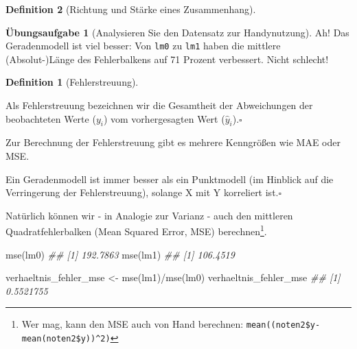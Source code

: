 \documentclass[
  a4paper,
  DIV=11]{scrreprt}
\newenvironment{Shaded}{\begin{snugshade}}{\end{snugshade}}
\newcommand{\DocumentationTok}[1]{\textcolor[rgb]{0.37,0.37,0.37}{\textit{#1}}}
\newcommand{\FunctionTok}[1]{\textcolor[rgb]{0.28,0.35,0.67}{#1}}
\newcommand{\NormalTok}[1]{\textcolor[rgb]{0.00,0.23,0.31}{#1}}
\newcommand{\OtherTok}[1]{\textcolor[rgb]{0.00,0.23,0.31}{#1}}
\newcommand{\SpecialCharTok}[1]{\textcolor[rgb]{0.37,0.37,0.37}{#1}}
\theoremstyle{definition}
\newtheorem{exercise}{Übungsaufgabe}[chapter]
\theoremstyle{definition}
\theoremstyle{definition}
\newtheorem{definition}{Definition}[chapter]
\theoremstyle{remark}
\begin{document}
\begin{definition}[Richtung und Stärke eines
Zusammenhang]
\begin{exercise}[Analysieren Sie den Datensatz zur
Handynutzung]
Ah! Das Geradenmodell ist viel besser: Von \texttt{lm0} zu \texttt{lm1}
haben die mittlere (Absolut-)Länge des Fehlerbalkens auf 71 Prozent
verbessert. Nicht schlecht!

\begin{definition}[Fehlerstreuung]\protect\hypertarget{def-fehlerstreung}{}\label{def-fehlerstreung}

Als Fehlerstreuung bezeichnen wir die Gesamtheit der Abweichungen der
beobachteten Werte (\(y_i\)) vom vorhergesagten Wert
(\(\hat{y}_i\)).\(\square\)

\end{definition}

Zur Berechnung der Fehlerstreuung gibt es mehrere Kenngrößen wie MAE
oder MSE.

\begin{tcolorbox}[enhanced jigsaw, leftrule=.75mm, opacitybacktitle=0.6, colback=white, colframe=quarto-callout-note-color-frame, coltitle=black, colbacktitle=quarto-callout-note-color!10!white, opacityback=0, left=2mm, breakable, titlerule=0mm, toptitle=1mm, bottomtitle=1mm, rightrule=.15mm, title=\textcolor{quarto-callout-note-color}{\faInfo}\hspace{0.5em}{Hinweis}, arc=.35mm, bottomrule=.15mm, toprule=.15mm]

Ein Geradenmodell ist immer besser als ein Punktmodell (im Hinblick auf
die Verringerung der Fehlerstreuung), solange X mit Y korreliert
ist.\(\square\)

\end{tcolorbox}

Natürlich können wir - in Analogie zur Varianz - auch den mittleren
Quadratfehlerbalken (Mean Squared Error, MSE) berechnen\footnote{Wer
  mag, kann den MSE auch von Hand berechnen:
  \texttt{mean((noten2\$y-mean(noten2\$y))\^{}2)}}.

\begin{Shaded}
\begin{Highlighting}[]
\FunctionTok{mse}\NormalTok{(lm0)}
\DocumentationTok{\#\# [1] 192.7863}
\FunctionTok{mse}\NormalTok{(lm1)}
\DocumentationTok{\#\# [1] 106.4519}
\end{Highlighting}
\end{Shaded}

\begin{Shaded}
\begin{Highlighting}[]
\NormalTok{verhaeltnis\_fehler\_mse }\OtherTok{\textless{}{-}} \FunctionTok{mse}\NormalTok{(lm1)}\SpecialCharTok{/}\FunctionTok{mse}\NormalTok{(lm0)}
\NormalTok{verhaeltnis\_fehler\_mse}
\DocumentationTok{\#\# [1] 0.5521755}
\end{Highlighting}
\end{Shaded}


\end{exercise}
\end{definition}
\end{document}

